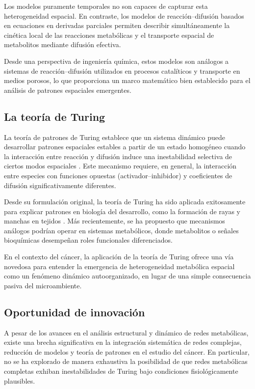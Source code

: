 \documentclass[12pt,spanish]{article}
\begin{document}
	Los modelos puramente temporales no son capaces de capturar esta heterogeneidad espacial. En contraste, los modelos de reacción--difusión basados en ecuaciones en derivadas parciales permiten describir simultáneamente la cinética local de las reacciones metabólicas y el transporte espacial de metabolitos mediante difusión efectiva.
	
	Desde una perspectiva de ingeniería química, estos modelos son análogos a sistemas de reacción--difusión utilizados en procesos catalíticos y transporte en medios porosos, lo que proporciona un marco matemático bien establecido para el análisis de patrones espaciales emergentes.
	
	\subsection{La teoría de Turing}
	
	La teoría de patrones de Turing establece que un sistema dinámico puede desarrollar patrones espaciales estables a partir de un estado homogéneo cuando la interacción entre reacción y difusión induce una inestabilidad selectiva de ciertos modos espaciales \cite{Turing1990}. Este mecanismo requiere, en general, la interacción entre especies con funciones opuestas (activador--inhibidor) y coeficientes de difusión significativamente diferentes.
	
	Desde su formulación original, la teoría de Turing ha sido aplicada exitosamente para explicar patrones en biología del desarrollo, como la formación de rayas y manchas en tejidos \cite{Kondo2010}. Más recientemente, se ha propuesto que mecanismos análogos podrían operar en sistemas metabólicos, donde metabolitos o señales bioquímicas desempeñan roles funcionales diferenciados.
	
	En el contexto del cáncer, la aplicación de la teoría de Turing ofrece una vía novedosa para entender la emergencia de heterogeneidad metabólica espacial como un fenómeno dinámico autoorganizado, en lugar de una simple consecuencia pasiva del microambiente.
	
	\subsection{Oportunidad de innovación}
	
	A pesar de los avances en el análisis estructural y dinámico de redes metabólicas, existe una brecha significativa en la integración sistemática de redes complejas, reducción de modelos y teoría de patrones en el estudio del cáncer. En particular, no se ha explorado de manera exhaustiva la posibilidad de que redes metabólicas completas exhiban inestabilidades de Turing bajo condiciones fisiológicamente plausibles.
	
\end{document}
